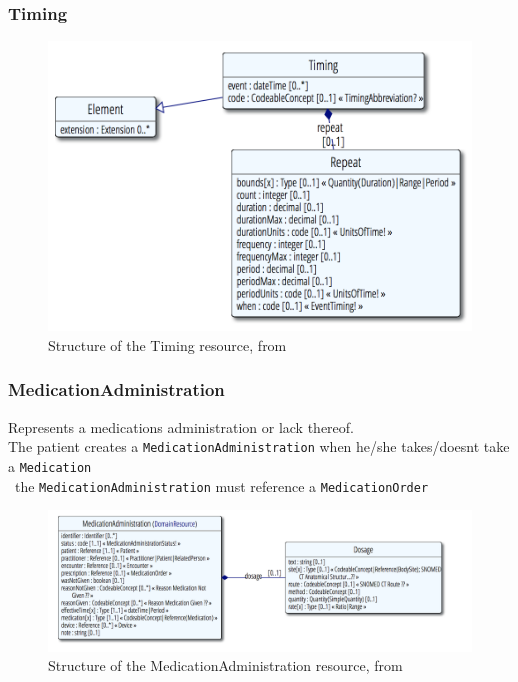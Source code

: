 \documentclass{article}
\begin{document}
\subsubsection{Timing}\label{res:timing}
\begin{figure}[H]
\centering
\includegraphics[width=\linewidth]{resources/FHIR/Timing.png}
\caption{Structure of the Timing resource, from \citep{res-timing}}
\label{fig:structure-timing}
\end{figure}


\subsubsection{MedicationAdministration}\label{res:medicationadministration}
Represents a medications administration or lack thereof.
\\
The patient creates a \texttt{MedicationAdministration} when he/she takes/doesnt take a \texttt{Medication}
\\\
the \texttt{MedicationAdministration} must reference a \texttt{MedicationOrder}

\begin{figure}[H]
\centering
\includegraphics[width=\linewidth]{resources/FHIR/MedicationAdministration/MedicationAdministration-UML.png}
\caption{Structure of the MedicationAdministration resource, from \citep{res-medicationadministration}}
\label{fig:structure-medication-administration}
\end{figure}
\end{document}
